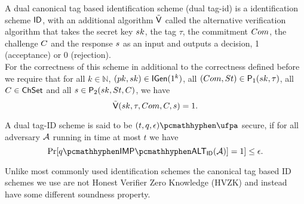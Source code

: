 \begin{definition}
A dual canonical tag based identification scheme (dual tag-id) is a identification scheme $\mathsf{ID}$, with an additional algorithm $\tilde{\mathsf{V}}$ called the alternative verification algorithm that takes the secret key $sk$, the tag $\tau$, the commitment $Com$, the challenge $C$ and the response $s$ as an input and outputs a decision, 1 (acceptance) or 0 (rejection).
\\
For the correctness of this scheme in additional to the correctness defined before we require that for all $k \in \mathbb{N}$,
$(pk,sk) \in \mathsf{IGen}(1^k)$,
all
$(Com,St) \in \mathsf{P}_1(sk, \tau)$,
all $C \in \mathsf{ChSet}$ and all 
$s \in \mathsf{P}_2(sk,St,C)$,
we have
$$ \tilde{\mathsf{V}}(sk,\tau,Com,C,s) = 1.$$
\end{definition}

\begin{definition}
A dual tag-ID scheme is said to be $(t,q,\epsilon)\hyph \ufpa$ secure, if for all adversary $\mathcal{A}$ running in time at most $t$ we have
$$\Pr[q\hyph\xsoundness_{\ID}(\adv)]=1] \leq \epsilon.$$
\end{definition}

Unlike most commonly used identification schemes the canonical tag based ID schemes we use are not Honest Verifier Zero Knowledge (HVZK) and instead have some different soundness property.

\begin{figure}[htb!]
    \centering
    \nicoresetlinenr
    \caption{}
    \label{fig:x-soundess}
\end{figure}




